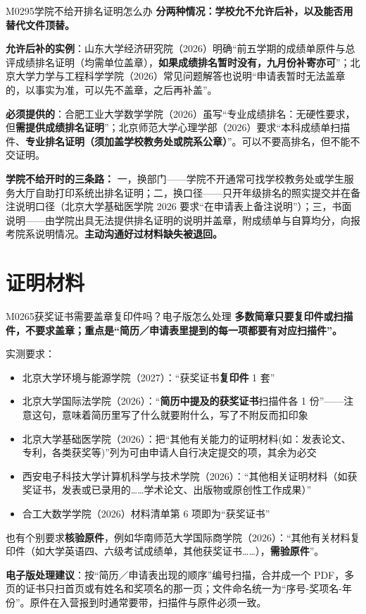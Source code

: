 \begin{qa}{M0295}{学院不给开排名证明怎么办}
\textbf{分两种情况：学校允不允许后补，以及能否用替代文件顶替。}

\textbf{允许后补的实例}：山东大学经济研究院（2026）明确“前五学期的成绩单原件与总评成绩排名证明（均需单位盖章），\textbf{如果成绩排名暂时没有，九月份补寄亦可}”；北京大学力学与工程科学学院（2026）常见问题解答也说明“申请表暂时无法盖章的，以事实为准，可以先不盖章，之后再补盖”。

\textbf{必须提供的}：合肥工业大学数学学院（2026）虽写“专业成绩排名：无硬性要求，但\textbf{需提供成绩排名证明}”；北京师范大学心理学部（2026）要求“本科成绩单扫描件、\textbf{专业排名证明（须加盖学校教务处或院系公章）}”。可以不要高排名，但不能不交证明。

\textbf{学院不给开时的三条路：} 一，换部门——学院不开通常可找学校教务处或学生服务大厅自助打印系统出排名证明；二，换口径——只开年级排名的照实提交并在备注说明口径（北京大学基础医学院 2026 要求“在申请表上备注说明”）；三，书面说明——由学院出具无法提供排名证明的说明并盖章，附成绩单与自算均分，向报考院系说明情况。\textbf{主动沟通好过材料缺失被退回。}
\end{qa}

\section{证明材料}
\begin{qa}{M0265}{获奖证书需要盖章复印件吗？电子版怎么处理}
\textbf{多数简章只要复印件或扫描件，不要求盖章；重点是“简历／申请表里提到的每一项都要有对应扫描件”。}

实测要求：

\begin{itemize}
  \item 北京大学环境与能源学院（2027）：“获奖证书\textbf{复印件} 1 套”
  \item 北京大学国际法学院（2026）：“\textbf{简历中提及的获奖证书}扫描件各 1 份”——注意这句，意味着简历里写了什么就要附什么，写了不附反而扣印象
  \item 北京大学基础医学院（2026）：把“其他有关能力的证明材料(如：发表论文、专利，各类获奖等)”列为可由申请人自行决定提交的项，其余为必交
  \item 西安电子科技大学计算机科学与技术学院（2026）：“其他相关证明材料（如获奖证书，发表或已录用的……学术论文、出版物或原创性工作成果）”
  \item 合工大数学学院（2026）材料清单第 6 项即为“获奖证书”
\end{itemize}

也有个别要求\textbf{核验原件}，例如华南师范大学国际商学院（2026）：“其他有关材料复印件（如大学英语四、六级考试成绩单，其他获奖证书……），\textbf{需验原件}”。

\textbf{电子版处理建议}：按“简历／申请表出现的顺序”编号扫描，合并成一个 PDF，多页的证书只扫首页或有姓名和奖项名的那一页；文件命名统一为“序号-奖项名-年份”。原件在入营报到时通常要带，扫描件与原件必须一致。
\end{qa}

